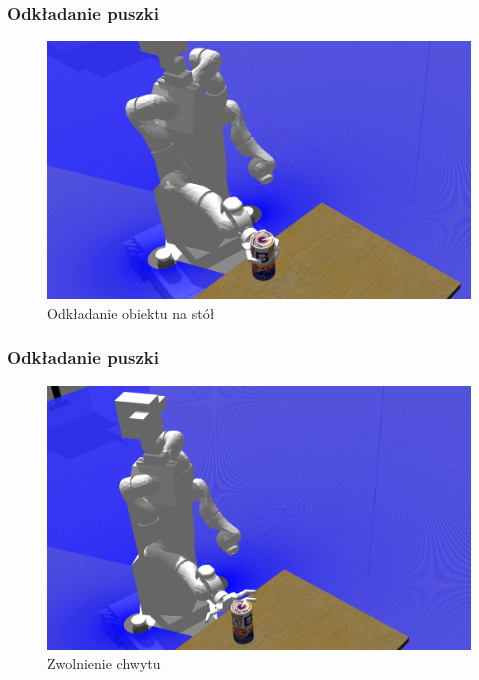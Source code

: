 \addtocounter{framenumber}{-1}
\begin{frame}
	\frametitle{Odkładanie puszki}
	\begin{figure}[b]
        \label{sim_map}
        \centering
        \def\svgwidth{\columnwidth}
        \includegraphics[scale=0.27]{images/testpuszka/odkladanie_puszki_cont.png}
        \caption{Odkładanie obiektu na stół}
    \end{figure}
\end{frame}

\addtocounter{framenumber}{-1}
\begin{frame}
	\frametitle{Odkładanie puszki}
	\begin{figure}[b]
        \label{sim_map}
        \centering
        \def\svgwidth{\columnwidth}
        \includegraphics[scale=0.27]{images/testpuszka/puszka_na_stole.png}
        \caption{Zwolnienie chwytu}
    \end{figure}
\end{frame}


